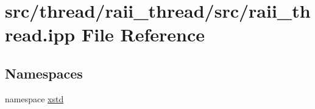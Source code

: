 \hypertarget{raii__thread_8ipp}{\section{src/thread/raii\-\_\-thread/src/raii\-\_\-thread.ipp File Reference}
\label{raii__thread_8ipp}
}
\subsection*{Namespaces}
\begin{DoxyCompactItemize}
\item 
namespace \hyperlink{namespacexstd}{xstd}
\end{DoxyCompactItemize}
